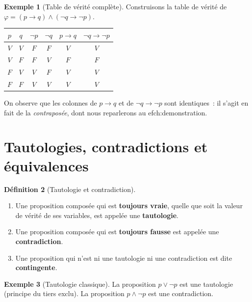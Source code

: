 \documentclass[12pt,a4paper,openany]{book}
\theoremstyle{definition}
\newtheorem{definition}{Définition}[chapter]
\newtheorem{exemple}[definition]{Exemple}
\theoremstyle{plain}
\theoremstyle{remark}
\begin{document}
\begin{exemple}[Table de v\'erit\'e compl\`ete]\label{ex:table-complete}
  Construisons la table de v\'erit\'e de $\varphi = (p \to q) \land (\neg q \to \neg p)$.
  \begin{center}
  \begin{tabular}{cc|c|c|c|c}
    \toprule
    $p$ & $q$ & $\neg p$ & $\neg q$ & $p \to q$ & $\neg q \to \neg p$ \\
    \midrule
    $V$ & $V$ & $F$ & $F$ & $V$ & $V$ \\
    $V$ & $F$ & $F$ & $V$ & $F$ & $F$ \\
    $F$ & $V$ & $V$ & $F$ & $V$ & $V$ \\
    $F$ & $F$ & $V$ & $V$ & $V$ & $V$ \\
    \bottomrule
  \end{tabular}
  \end{center}
  On observe que les colonnes de $p \to q$ et de $\neg q \to \neg p$ sont identiques~: il s'agit en fait de la \emph{contrapos\'ee}, dont nous reparlerons au 
ef{ch:demonstration}.
\end{exemple}

\section{Tautologies, contradictions et \'equivalences}
\label{sec:tautologies}

\begin{definition}[Tautologie et contradiction]\label{def:tautologie}
  \begin{enumerate}[label=(\roman*)]
    \item Une proposition compos\'ee qui est \textbf{toujours vraie}, quelle que soit la valeur de v\'erit\'e de ses variables, est appel\'ee une \textbf{tautologie}.
    \item Une proposition compos\'ee qui est \textbf{toujours fausse} est appel\'ee une \textbf{contradiction}.
    \item Une proposition qui n'est ni une tautologie ni une contradiction est dite \textbf{contingente}.
  \end{enumerate}
\end{definition}

\begin{exemple}[Tautologie classique]\label{ex:tautologie}
  La proposition $p \lor \neg p$ est une tautologie (principe du tiers exclu). La proposition $p \land \neg p$ est une contradiction.
\end{exemple}
\end{document}
